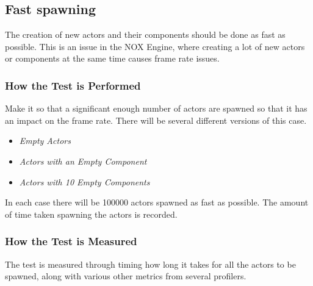 \subsection{Fast spawning}
The creation of new actors and their components should be done as fast as possible.
This is an issue in the NOX Engine, where creating a lot of new actors or components at the same time causes frame rate issues.

\subsubsection*{How the Test is Performed}
Make it so that a significant enough number of actors are spawned so that it has an impact on the frame rate.
There will be several different versions of this case.

\begin{itemize}

    \item\noindent\textit{Empty Actors}\\

    \item\noindent\textit{Actors with an Empty Component}\\

    \item\noindent\textit{Actors with 10 Empty Components}\\

\end{itemize}
In each case there will be 100000 actors spawned as fast as possible.
The amount of time taken spawning the actors is recorded.


\subsubsection*{How the Test is Measured}
The test is measured through timing how long it takes for all the actors to be spawned, along with various other metrics from several profilers.
